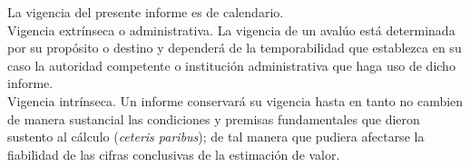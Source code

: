La vigencia del presente informe es de \textcolor{terciario}{\vigenciaInforme{} calendario}.\\[5pt]

\textcolor{secundario}{Vigencia extr\'inseca o administrativa. }La vigencia de un aval\'uo est\'a determinada por su prop\'osito o destino y depender\'a de la temporabilidad que establezca en su caso la autoridad competente o instituci\'on administrativa que haga uso de dicho informe. \\[10pt]
\textcolor{secundario}{Vigencia intr\'inseca. } Un informe conservar\'a su vigencia hasta en tanto no cambien de manera sustancial las condiciones y premisas fundamentales que dieron sustento al c\'alculo (\textit{ceteris paribus}); de tal manera que pudiera afectarse la fiabilidad de las cifras conclusivas de la estimaci\'on de valor.